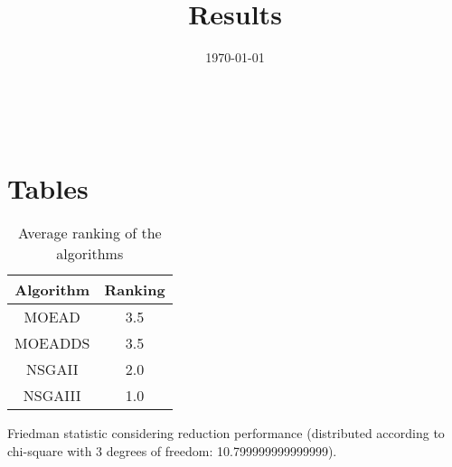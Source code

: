 \documentclass{article}
\title{Results}
\author{}
\date{\today}
\begin{document}
\oddsidemargin 0in \topmargin 0in\maketitle
\
\section{Tables}
\begin{table}[!htp]
\centering
\caption{Average ranking of the algorithms}
\begin{tabular}{c|c}
Algorithm&Ranking\\
\hline
MOEAD&3.5\\
MOEADDS&3.5\\
NSGAII&2.0\\
NSGAIII&1.0\\
\end{tabular}
\end{table}


Friedman statistic considering reduction performance (distributed according to chi-square with 3 degrees of freedom: 10.799999999999999).
\end{document}
